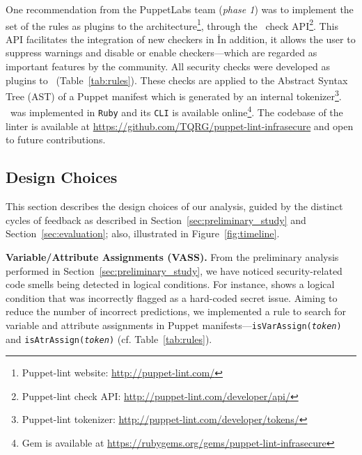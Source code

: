One recommendation from the PuppetLabs team (\textit{phase 1}) was to implement 
the set of the rules as plugins to the \puplint{} architecture\footnote{Puppet-lint website: \url{http://puppet-lint.com/}},
through the \puplint\ check API\footnote{Puppet-lint check API: \url{http://puppet-lint.com/developer/api/}}. 
This API facilitates the integration of new checkers in \puplint\. 
In addition, it allows the user to suppress warnings and disable or enable
checkers---which are regarded as important features by the community. All 
security checks were developed as plugins to \puplint\ (Table~\ref{tab:rules}). 
These checks are applied to the Abstract Syntax Tree (AST) of a Puppet manifest which 
is generated by an internal tokenizer\footnote{Puppet-lint tokenizer: \url{http://puppet-lint.com/developer/tokens/}}.
\toolname\ was implemented in \texttt{Ruby} and its \texttt{CLI} is available 
online\footnote{Gem is available at \url{https://rubygems.org/gems/puppet-lint-infrasecure}}.
The codebase of the linter is available 
at \url{https://github.com/TQRG/puppet-lint-infrasecure} and open to future contributions.

\subsection{Design Choices}\label{sec:design}

This section describes the design choices of our analysis, guided by 
the distinct cycles of feedback as described in Section~\ref{sec:preliminary_study} 
and Section~\ref{sec:evaluation}; also, illustrated in Figure~\ref{fig:timeline}.

\textbf{Variable/Attribute Assignments (VASS).} From the preliminary 
analysis performed in Section~\ref{sec:preliminary_study}, we have noticed 
security-related code smells being detected in logical conditions. For instance, 
 shows a logical condition that 
was incorrectly flagged as a hard-coded secret issue. Aiming to 
reduce the number of incorrect predictions, we implemented a rule to search 
for variable and attribute assignments in Puppet manifests---\texttt{isVarAssign(\textit{token})}
and \texttt{isAtrAssign(\textit{token})} (cf. Table~\ref{tab:rules}).

